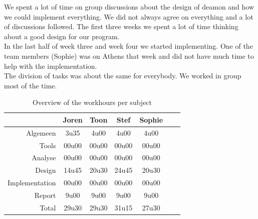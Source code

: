 \documentclass[i2]{oss}
\begin{document}
We spent a lot of time on group discussions about the design of deamon and how we could implement everything. We did not always agree on everything and a lot of discussions followed. The first three weeks we spent a lot of time thinking about a good design for our program.\\ 

In the last half of week three and week four we started  implementing. One of the team members (Sophie) was on Athens that week and did not have much time to help with the implementation. \\

The division of tasks was about the same for everybody. We worked in group most of the time. 

\begin{table}[h!]
\begin{center}
    \begin{tabular}{ r | c  c  c  c  c  c}
     & Joren & Toon & Stef & Sophie \\ \hline
    Algemeen & 3u35 & 4u00 & 4u00 & 4u00\\
           Tools & 00u00 & 00u00 & 00u00 & 00u00 \\
        Analyse & 00u00 & 00u00 & 00u00 & 00u00 \\
        Design & 14u45 & 20u30 & 24u45 & 20u30 \\
        Implementation & 00u00 & 00u00 & 00u00 & 00u00\\
        Report & 9u00 & 9u00 & 9u00 & 9u00 \\
        Total & 29u30 & 29u30 & 31u15 & 27u30  
    \end{tabular}
    \caption{Overview of the workhours per subject}
    \label{tab:werkuren}
\end{center}
\end{table}
\end{document}
